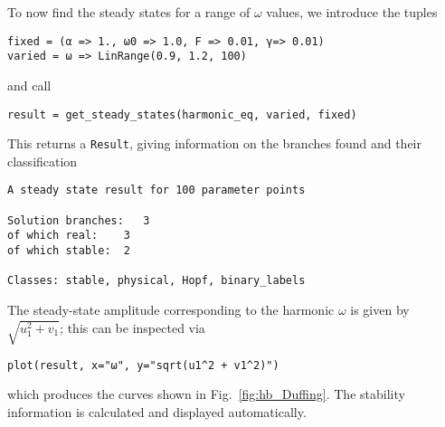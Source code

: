 To now find the steady states for a range of $\omega$ values, we introduce the tuples
%
\begin{lstlisting}[numbers=none]
fixed = (α => 1., ω0 => 1.0, F => 0.01, γ=> 0.01)
varied = ω => LinRange(0.9, 1.2, 100)
\end{lstlisting}
%
and call
%
\begin{lstlisting}[numbers=none]
result = get_steady_states(harmonic_eq, varied, fixed)
\end{lstlisting}
%
This returns a \texttt{Result}, giving information on the branches found and their classification
\begin{lstlisting}[numbers=none, basicstyle=\scriptsize\ttfamily, keywordstyle=\color{black}]
A steady state result for 100 parameter points

Solution branches:   3
of which real:    3
of which stable:  2

Classes: stable, physical, Hopf, binary_labels
\end{lstlisting}
The steady-state amplitude corresponding to the harmonic $\omega$ is given by $\sqrt{u_1^2+v_1}$; this can be inspected via
%
\begin{lstlisting}[numbers=none]
plot(result, x="ω", y="sqrt(u1^2 + v1^2)")
\end{lstlisting}
%
which produces the curves shown in Fig.~\ref{fig:hb_Duffing}. The stability information is calculated and displayed automatically. 
%

